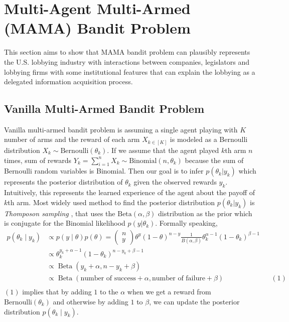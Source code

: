 \documentclass{article}
\begin{document}
\section{Multi-Agent Multi-Armed (MAMA) Bandit Problem}
This section aims to show that MAMA bandit problem can plausibly represents the U.S. lobbying industry with interactions between companies, legislators and lobbying firms with some institutional features that can explain the lobbying as a delegated information acquisition process.

\subsection{Vanilla Multi-Armed Bandit Problem} \label{vanilla}
Vanilla multi-armed bandit problem is assuming a single agent playing with $K$ number of arms and the reward of each arm $X_{k\in [K]}$ is modeled as a Bernoulli distribution $X_k \sim \mathrm{Bernoulli}(\theta_k)$.
If we assume that the agent played $k$th arm $n$ times, sum of rewards $Y_k=\sum_{i=1}^{n} X_k \sim \mathrm{Binomial}(n, \theta_k)$ because the sum of Bernoulli random variables is Binomial.
Then our goal is to infer $p(\theta_k|y_k)$ which represents the posterior distribution of $\theta_k$ given the observed rewards $y_k$. Intuitively, this represents the learned experience of the agent about the payoff of $k$th arm.
Most widely used method to find the posterior distribution $p(\theta_k|y_k)$ is \textit{Thomposon sampling} \citep{tom}, that uses the $\mathrm{Beta}(\alpha, \beta)$ distribution as the prior which is conjugate for the Binomial likelihood $p(y|\theta_k)$. Formally speaking,
\begin{align*}
p(\theta_k \mid y_k) & \propto p(y \mid \theta) p(\theta) =\left(\begin{array}{l}
n \\
y
\end{array}\right) \theta^y(1-\theta)^{n-y} \frac{1}{B(\alpha, \beta)} \theta_k^{\alpha-1}(1-\theta_k)^{\beta-1} \\
& \propto \theta_k^{y_k+\alpha-1}(1-\theta_k)^{n-y_k+\beta-1} \\
& \propto \operatorname{Beta}(y_k+\alpha, n-y_k+\beta) \\
& \propto \operatorname{Beta}(\text{number of success}+\alpha, \text{number of failure}+\beta) && (1)\\
\end{align*}
$(1)$ implies that by adding $1$ to the $\alpha$ when we get a reward from $\mathrm{Bernoulli}(\theta_k)$ and otherwise by adding $1$ to $\beta$,
we can update the posterior distribution $p(\theta_k \mid y_k)$.
\end{document}
